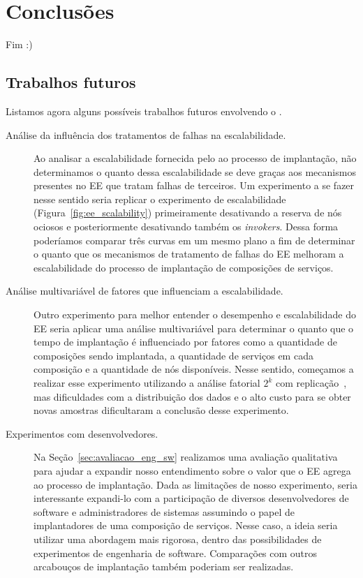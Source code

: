 \chapter{Conclusões}
\label{cap:conclusoes}

Fim :)

\section{Trabalhos futuros}

Listamos agora alguns possíveis trabalhos futuros envolvendo o \ee.

\begin{description}

\item[Análise da influência dos tratamentos de falhas na escalabilidade.] 
Ao analisar a escalabilidade fornecida pelo \ee ao processo de implantação,
não determinamos o quanto dessa escalabilidade se deve graças aos mecanismos 
presentes no EE que tratam falhas de terceiros.
Um experimento a se fazer nesse sentido seria replicar o experimento 
de escalabilidade (Figura~\ref{fig:ee_scalability})
primeiramente desativando a reserva de nós ociosos e posteriormente
desativando também os \emph{invokers}.
Dessa forma poderíamos comparar três curvas em um mesmo plano
a fim de determinar o quanto que os mecanismos de tratamento de falhas
do EE melhoram a escalabilidade do processo de implantação de composições de serviços.

\item[Análise multivariável de fatores que influenciam a escalabilidade.] 
Outro experimento para melhor entender o desempenho e escalabilidade do EE
seria aplicar uma análise multivariável para determinar o quanto
que o tempo de implantação é influenciado por fatores como a quantidade de composições
sendo implantada, a quantidade de serviços em cada composição e a quantidade
de nós disponíveis.
Nesse sentido, começamos a realizar esse experimento utilizando a análise fatorial $2^k$
com replicação~\cite{Jain20002kr}, mas dificuldades com a distribuição dos dados e o alto custo
para se obter novas amostras dificultaram a conclusão desse experimento.

\item[Experimentos com desenvolvedores.] 
Na Seção~\ref{sec:avaliacao_eng_sw} realizamos uma avaliação qualitativa para
ajudar a expandir nosso entendimento sobre o valor que o EE agrega ao processo de implantação.
Dada as limitações de nosso experimento, seria interessante expandi-lo
com a participação de diversos desenvolvedores de software
e administradores de sistemas assumindo o papel de implantadores de uma composição de serviços.
Nesse caso, a ideia seria utilizar uma abordagem mais rigorosa,
dentro das possibilidades de experimentos de engenharia de software.
Comparações com outros arcabouços de implantação também poderiam ser realizadas.


\end{description}
